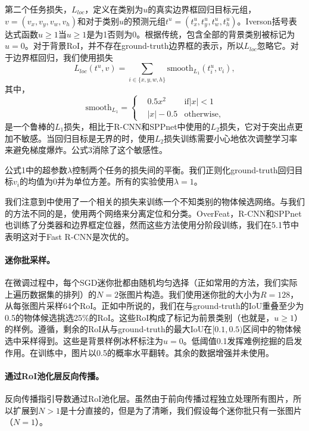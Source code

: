 \documentclass[../main]{subfile}
\begin{document}
第二个任务损失，$L_{loc}$，定义在类别为$u$的真实边界框回归目标元组，$v=(v_x, v_y,v_w,v_h)$和对于类别$u$的预测元组$t^u=(t_x^u, t_y^u, t_w^u, t_h^u)$。Iverson括号表达式函数$u \ge 1$当$u \ge1$是为1否则为0。根据传统，包含全部的背景类别被标记为$u=0$。对于背景RoI，并不存在ground-truth边界框的表示，所以$L_{loc}$忽略它。对于边界框回归，我们使用损失
\begin{equation}
    L_{loc}(t^u, v) = \sum_{i\in \{x, y,w,h\}}\text{smooth}_{L_1}(t_i^u, v_i),
\end{equation}
其中，
\begin{equation}
    \text{smooth}_{L_1} = \left\{
    \begin{aligned}
         & 0.5x^2    & \text{if} |x| < 1 \\
         & |x| - 0.5 & \text{otherwise,}
    \end{aligned}
    \right.
\end{equation}
是一个鲁棒的$L_1$损失，相比于R-CNN和SPPnet中使用的$L_2$损失，它对于突出点更加不敏感。当回归目标是无界的时，使用$L_2$损失训练需要小心地依次调整学习率来避免梯度爆炸。公式3消除了这个敏感性。

公式1中的超参数$\lambda$控制两个任务的损失间的平衡。我们正则化ground-truth回归目标$v_i$的均值为0并为单位方差。所有的实验使用$\lambda=1$。

我们注意到\cite{6}中使用了一个相关的损失来训练一个不知类别的物体候选网络。与我们的方法不同的是，\cite{6}使用两个网络来分离定位和分类。OverFeat\cite{overfeat}，R-CNN\cite{rcnn}和SPPnet\cite{spp}也训练了分类器和边界框定位器，然而这些方法使用分阶段训练，我们在5.1节中表明这对于Fast R-CNN是次优的。

\paragraph{迷你批采样。}在微调过程中，每个SGD迷你批都由随机均匀选择（正如常用的方法，我们实际上遍历数据集的排列）的$N=2$张图片构造。我们使用迷你批的大小为$R=128$，从每张图片采样64个RoI。正如\cite{rcnn}中所说的，我们在与ground-truth的IoU重叠至少为0.5的物体候选挑选25\%的RoI。这些RoI构成了标记为前景类别（也就是，$u \ge 1$）的样例。遵循\cite{spp}，剩余的RoI从与ground-truth的最大IoU在$[0.1, 0.5)$区间中的物体候选中采样得到。这些是背景样例冰杯标注为$u=0$。低阈值0.1发挥难例挖掘的启发作用。在训练中，图片以0.5的概率水平翻转。其余的数据增强并未使用。

\paragraph{通过RoI池化层反向传播。}反向传播指引导数通过RoI池化层。虽然由于前向传播过程独立处理所有图片，所以扩展到$N>1$是十分直接的，但是为了清晰，我们假设每个迷你批只有一张图片（$N=1$）。
\end{document}
